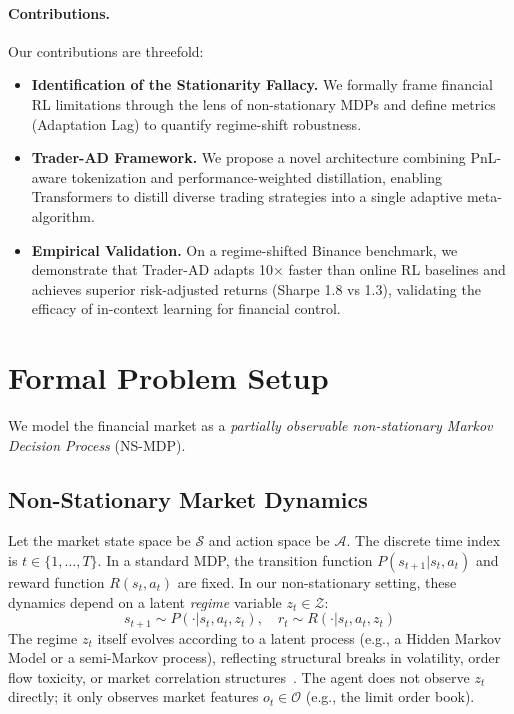 \documentclass{article}
\begin{document}
\paragraph{Contributions.}
Our contributions are threefold:
\begin{itemize}[leftmargin=*, nosep, labelsep=1em]
    \item \textbf{Identification of the Stationarity Fallacy.} We formally frame financial RL limitations through the lens of non-stationary MDPs and define metrics (Adaptation Lag) to quantify regime-shift robustness.
    \item \textbf{Trader-AD Framework.} We propose a novel architecture combining PnL-aware tokenization and performance-weighted distillation, enabling Transformers to distill diverse trading strategies into a single adaptive meta-algorithm.
    \item \textbf{Empirical Validation.} On a regime-shifted Binance benchmark, we demonstrate that Trader-AD adapts 10$\times$ faster than online RL baselines and achieves superior risk-adjusted returns (Sharpe 1.8 vs 1.3), validating the efficacy of in-context learning for financial control.
\end{itemize}

\section{Formal Problem Setup}
\label{sec:problem}

We model the financial market as a \emph{partially observable non-stationary Markov Decision Process} (NS-MDP).

\subsection{Non-Stationary Market Dynamics}
Let the market state space be $\mathcal{S}$ and action space be $\mathcal{A}$. The discrete time index is $t \in \{1, \dots, T\}$. In a standard MDP, the transition function $P(s_{t+1}|s_t, a_t)$ and reward function $R(s_t, a_t)$ are fixed. In our non-stationary setting, these dynamics depend on a latent \emph{regime} variable $z_t \in \mathcal{Z}$:
\begin{equation}
    s_{t+1} \sim P(\cdot | s_t, a_t, z_t), \quad r_t \sim R(\cdot | s_t, a_t, z_t)
\end{equation}
The regime $z_t$ itself evolves according to a latent process (e.g., a Hidden Markov Model or a semi-Markov process), reflecting structural breaks in volatility, order flow toxicity, or market correlation structures~\citep{wei2021nonstationary}. The agent does not observe $z_t$ directly; it only observes market features $o_t \in \mathcal{O}$ (e.g., the limit order book).
\end{document}
